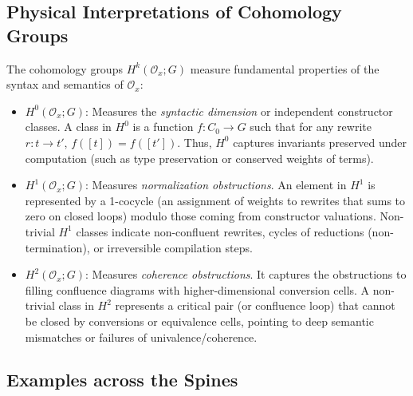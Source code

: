 \documentclass{article}
\theoremstyle{definition}
\theoremstyle{plain}
\begin{document}
\subsection{Physical Interpretations of Cohomology Groups}
The cohomology groups $H^k(\mathcal{O}_x; G)$ measure fundamental properties of the syntax and semantics of $\mathcal{O}_x$:
\begin{itemize}
    \item $H^0(\mathcal{O}_x; G)$: Measures the \emph{syntactic dimension} or independent constructor classes. A class in $H^0$ is a function $f : C_0 \to G$ such that for any rewrite $r : t \to t'$, $f([t]) = f([t'])$. Thus, $H^0$ captures invariants preserved under computation (such as type preservation or conserved weights of terms).
    \item $H^1(\mathcal{O}_x; G)$: Measures \emph{normalization obstructions}. An element in $H^1$ is represented by a 1-cocycle (an assignment of weights to rewrites that sums to zero on closed loops) modulo those coming from constructor valuations. Non-trivial $H^1$ classes indicate non-confluent rewrites, cycles of reductions (non-termination), or irreversible compilation steps.
    \item $H^2(\mathcal{O}_x; G)$: Measures \emph{coherence obstructions}. It captures the obstructions to filling confluence diagrams with higher-dimensional conversion cells. A non-trivial class in $H^2$ represents a critical pair (or confluence loop) that cannot be closed by conversions or equivalence cells, pointing to deep semantic mismatches or failures of univalence/coherence.
\end{itemize}

\subsection{Examples across the Spines}
\end{document}
